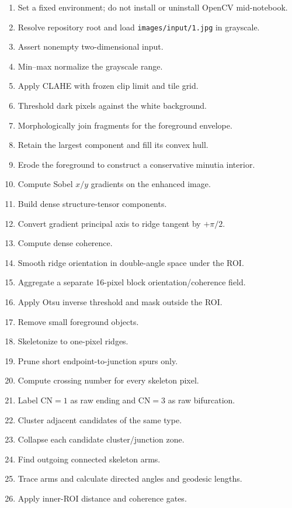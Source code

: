 \documentclass[11pt]{article}
\begin{document}
\begin{enumerate}
  \item Set a fixed environment; do not install or uninstall OpenCV mid-notebook.
  \item Resolve repository root and load \texttt{images/input/1.jpg} in grayscale.
  \item Assert nonempty two-dimensional input.
  \item Min--max normalize the grayscale range.
  \item Apply CLAHE with frozen clip limit and tile grid.
  \item Threshold dark pixels against the white background.
  \item Morphologically join fragments for the foreground envelope.
  \item Retain the largest component and fill its convex hull.
  \item Erode the foreground to construct a conservative minutia interior.
  \item Compute Sobel $x/y$ gradients on the enhanced image.
  \item Build dense structure-tensor components.
  \item Convert gradient principal axis to ridge tangent by $+\pi/2$.
  \item Compute dense coherence.
  \item Smooth ridge orientation in double-angle space under the ROI.
  \item Aggregate a separate 16-pixel block orientation/coherence field.
  \item Apply Otsu inverse threshold and mask outside the ROI.
  \item Remove small foreground objects.
  \item Skeletonize to one-pixel ridges.
  \item Prune short endpoint-to-junction spurs only.
  \item Compute crossing number for every skeleton pixel.
  \item Label CN$=1$ as raw ending and CN$=3$ as raw bifurcation.
  \item Cluster adjacent candidates of the same type.
  \item Collapse each candidate cluster/junction zone.
  \item Find outgoing connected skeleton arms.
  \item Trace arms and calculate directed angles and geodesic lengths.
  \item Apply inner-ROI distance and coherence gates.

\end{enumerate}
\end{document}
